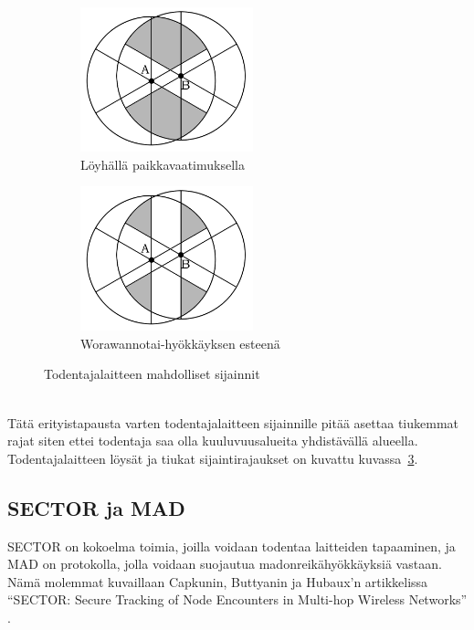\documentclass[finnish]{tktltiki2}
\theoremstyle{definition}
\theoremstyle{remark}
\begin{document}
\begin{figure}[!ht]
\begin{subfigure}{.5\textwidth}
  \centering
  \includegraphics[width=5cm]{verifier-loose}
  \caption{Löyhällä paikkavaatimuksella}
  \label{fig:sub1}
\end{subfigure}%
\begin{subfigure}{.5\textwidth}
  \centering
  \includegraphics[width=5cm]{verifier-strict}
  \caption{Worawannotai-hyökkäyksen esteenä}
  \label{fig:sub2}
\end{subfigure}%
\caption{Todentajalaitteen mahdolliset sijainnit}
\label{fig:worawannotai}
\end{figure}

\noindent \\
Tätä erityistapausta varten todentajalaitteen sijainnille pitää asettaa tiukemmat rajat siten ettei todentaja saa olla kuuluvuusalueita yhdistävällä alueella. Todentajalaitteen löysät ja tiukat sijaintirajaukset on kuvattu kuvassa~\ref{fig:worawannotai}.

% 
% 
% 
% 
% 
% 
% 
% 
% 
% 
% 
% 
\subsection{SECTOR ja MAD}
% 
% 
% 
% 
% 
% 
% 
% 
% 
% 
% 
% 
% 
% 
% 
% 

SECTOR on kokoelma toimia, joilla voidaan todentaa laitteiden tapaaminen, ja MAD on protokolla, jolla voidaan suojautua madonreikähyökkäyksiä vastaan. Nämä molemmat kuvaillaan Capkunin, Buttyanin ja Hubaux'n artikkelissa ``SECTOR: Secure Tracking of Node Encounters in Multi-hop Wireless Networks'' \cite{sector}.
\end{document}
